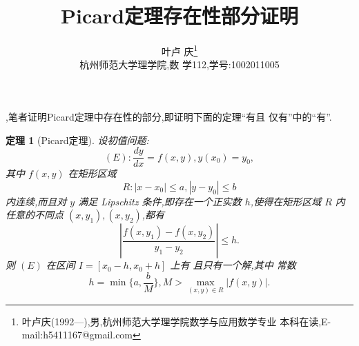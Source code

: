 \documentclass[a4paper]{article}
\newtheorem*{theorem}{定理}
\begin{document}
\title{\huge{\bf{Picard定理存在性部分证明}}} \author{\small{叶卢
    庆\footnote{叶卢庆(1992---),男,杭州师范大学理学院数学与应用数学专业
      本科在读,E-mail:h5411167@gmail.com}}\\{\small{杭州师范大学理学院,数
      学112,学号:1002011005}}}
\maketitle
{},笔者证明Picard定理中存在性的部分,即证明下面的定理“有且
仅有”中的“有”.

\begin{theorem}[Picard定理]
  设初值问题: $$ (E):\frac{dy}{dx}=f(x,y),y(x_0)=y_0, $$ 其中 $f(x,y)$
  在矩形区域 $$ R:|x-x_0|\leq a,|y-y_0|\leq b $$ 内连续,而且对 $y$ 满足
Lipschitz 条件,即存在一个正实数 $h$,使得在矩形区域 $R$ 内任意的不同点
  $(x,y_1),(x,y_2)$,都有
$$
\left|\frac{f(x,y_1)-f(x,y_2)}{y_1-y_2}\right|\leq h.
$$
则 $(E)$ 在区间 $I=[x_0-h,x_0+h]$ 上有 且只有一个解,其中
  常数 $$ h=\min\{a,\frac{b}{M}\},M>\max_{(x,y)\in R}|f(x,y)|. $$
\end{theorem}
\end{document}

